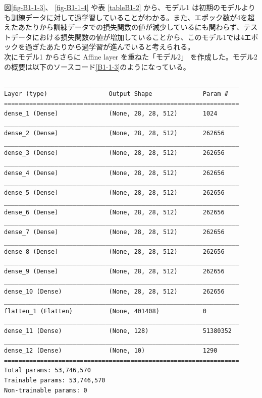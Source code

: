 \documentclass[a4paper,dvipdfmx]{jsarticle}
\begin{document}
図\ref{fig-B1-1-3}、 \ref{fig-B1-1-4} や表 \ref{tableB1-2} から、モデル1 は初期のモデルよりも訓練データに対して過学習していることがわかる。また、エポック数が4を超えたあたりから訓練データでの損失関数の値が減少しているにも関わらず、テストデータにおける損失関数の値が増加していることから、このモデル1では4エポックを過ぎたあたりから過学習が進んでいると考えられる。\\

次にモデル1 からさらに Affine layer を重ねた「モデル2」 を作成した。モデル2 の概要は以下のソースコード\ref{B1-1-3}のようになっている。

\begin{lstlisting}[caption="作成したモデル 2",label=B1-1-3]
_________________________________________________________________
Layer (type)                 Output Shape              Param #
=================================================================
dense_1 (Dense)              (None, 28, 28, 512)       1024
_________________________________________________________________
dense_2 (Dense)              (None, 28, 28, 512)       262656
_________________________________________________________________
dense_3 (Dense)              (None, 28, 28, 512)       262656
_________________________________________________________________
dense_4 (Dense)              (None, 28, 28, 512)       262656
_________________________________________________________________
dense_5 (Dense)              (None, 28, 28, 512)       262656
_________________________________________________________________
dense_6 (Dense)              (None, 28, 28, 512)       262656
_________________________________________________________________
dense_7 (Dense)              (None, 28, 28, 512)       262656
_________________________________________________________________
dense_8 (Dense)              (None, 28, 28, 512)       262656
_________________________________________________________________
dense_9 (Dense)              (None, 28, 28, 512)       262656
_________________________________________________________________
dense_10 (Dense)             (None, 28, 28, 512)       262656
_________________________________________________________________
flatten_1 (Flatten)          (None, 401408)            0
_________________________________________________________________
dense_11 (Dense)             (None, 128)               51380352
_________________________________________________________________
dense_12 (Dense)             (None, 10)                1290
=================================================================
Total params: 53,746,570
Trainable params: 53,746,570
Non-trainable params: 0
\end{lstlisting}
\end{document}
